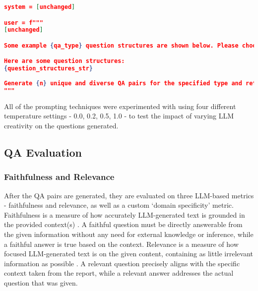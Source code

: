 \begin{lstlisting}[language=JSON,firstnumber=1,label={lst:memprompt},caption={CoT + few-shot prompt for `local' multiple-choice question generation}]
system = [unchanged]

user = f"""
[unchanged]

Some example {qa_type} question structures are shown below. Please choose {n} structures at random but do not limit yourself to these types only. If some of these structures do not make sense given the content of the document, adapt them to the context as appropriate or choose ones that you think are appropriate.

Here are some question structures:
{question_structures_str}  
    
Generate {n} unique and diverse QA pairs for the specified type and return them using the provided schema.
"""
\end{lstlisting}


All of the prompting techniques were experimented with using four different temperature settings - 0.0, 0.2, 0.5, 1.0 - to test the impact of varying LLM creativity on the questions generated. 




\subsection{QA Evaluation}

\subsubsection{Faithfulness and Relevance}

After the QA pairs are generated, they are evaluated on three LLM-based metrics - faithfulness and relevance, as well as a custom `domain specificity' metric. Faithfulness is a measure of how accurately LLM-generated text is grounded in the provided context(s) \cite{es2023ragas}. A faithful question must be directly answerable from the given information without any need for external knowledge or inference, while a faithful answer is true based on the context. Relevance is a measure of how focused LLM-generated text is on the given content, containing as little irrelevant information as possible \cite{es2023ragas}. A relevant question precisely aligns with the specific context taken from the report, while a relevant answer addresses the actual question that was given. \\

